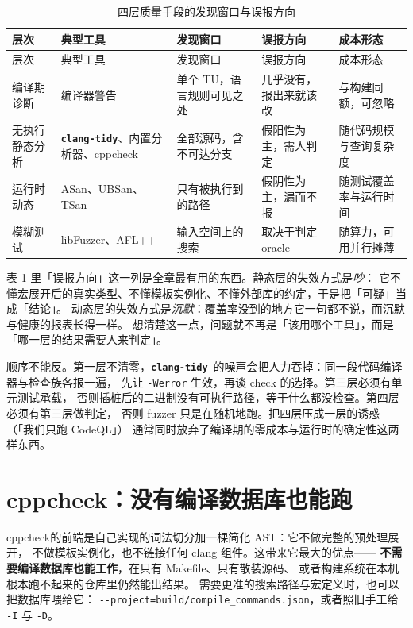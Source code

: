 \documentclass[12pt,a4paper,fontset=fandol]{ctexbook}
\newcommand{\Opt}[1]{\texttt{-\/-#1}}
\newcommand{\Bk}{\discretionary{}{}{}}
\newcommand{\Lib}[1]{\textbf{\texttt{#1}}}
\newcommand{\Tidy}{\Lib{clang-tidy}}
\begin{document}
\begin{longtable}{>{\raggedright\arraybackslash}p{}>{\raggedright\arraybackslash}p{}>{\raggedright\arraybackslash}p{}>{\raggedright\arraybackslash}p{}>{\raggedright\arraybackslash}p{}}
\caption{四层质量手段的发现窗口与误报方向}\label{tab:ch15-layers}\\
\toprule
层次 & 典型工具 & 发现窗口 & 误报方向 & 成本形态 \\
\midrule
\endfirsthead
\toprule
层次 & 典型工具 & 发现窗口 & 误报方向 & 成本形态 \\
\midrule
\endhead
编译期诊断 & 编译器警告 & 单个 TU，语言规则可见之处 & 几乎没有，报出来就该改 & 与构建同额，可忽略 \\
无执行静态分析 & \Tidy、内置分析器、\Bk cppcheck & 全部源码，含不可达分支 & 假阳性为主，需人判定 & 随代码规模与查询复杂度 \\
运行时动态 & ASan、UBSan、TSan & 只有被执行到的路径 & 假阴性为主，漏而不报 & 随测试覆盖率与运行时间 \\
模糊测试 & libFuzzer、AFL++ & 输入空间上的搜索 & 取决于判定 oracle & 随算力，可用并行摊薄 \\
\bottomrule
\end{longtable}

表 \ref{tab:ch15-layers} 里「误报方向」这一列是全章最有用的东西。静态层的失效方式是\emph{吵}：
它不懂宏展开后的真实类型、不懂模板实例化、不懂外部库的约定，于是把「可疑」当成「结论」。
动态层的失效方式是\emph{沉默}：覆盖率没到的地方它一句都不说，而沉默与健康的报表长得一样。
想清楚这一点，问题就不再是「该用哪个工具」，而是「哪一层的结果需要人来判定」。

\begin{guideline}[title={分层的顺序是依赖关系，不是偏好}]
顺序不能反。第一层不清零，\Tidy\ 的噪声会把人力吞掉：同一段代码编译器与检查族各报一遍，
先让 \texttt{-Werror} 生效，再谈 check 的选择。第三层必须有单元测试承载，
否则插桩后的二进制没有可执行路径，等于什么都没检查。第四层必须有第三层做判定，
否则 fuzzer 只是在随机地跑。把四层压成一层的诱惑（「我们只跑 CodeQL」）
通常同时放弃了编译期的零成本与运行时的确定性这两样东西。
\end{guideline}

\section{cppcheck：没有编译数据库也能跑}\label{sec:ch15-s2}

\Bk cppcheck\Bk 的前端是自己实现的词法切分加一棵简化 AST：它不做完整的预处理展开，
不做模板实例化，也不链接任何 clang 组件。这带来它最大的优点——
\textbf{不需要编译数据库也能工作}，在只有 Makefile、只有散装源码、
或者构建系统在本机根本跑不起来的仓库里仍然能出结果。
需要更准的搜索路径与宏定义时，也可以把数据库喂给它：
\Opt{project=build/{\Bk}\allowbreak compile\_commands.json}，或者照旧手工给 \texttt{-I} 与 \texttt{-D}。
\end{document}
